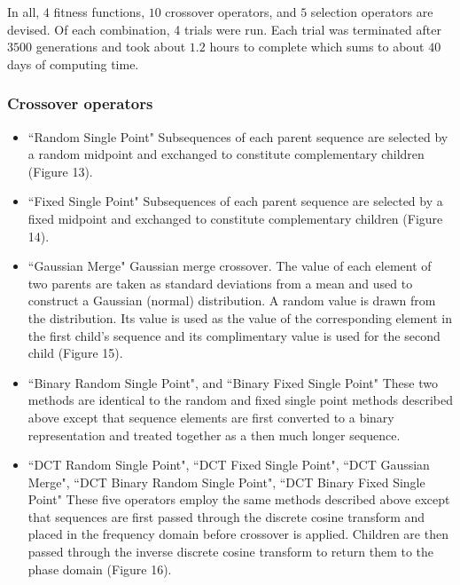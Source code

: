 \documentclass[12pt]{article}
\begin{document}
In all, $4$ fitness functions, $10$ crossover operators, and $5$ selection
operators
are devised.  Of each combination, 4 trials were run.  Each trial was
terminated after $3500$ generations and took about $1.2$ hours to complete
which sums to about $40$ days of computing time.

\subsubsection{Crossover operators}
\begin{itemize}
\item ``Random Single Point"  Subsequences of each parent sequence are selected by a random midpoint and exchanged to constitute complementary children (Figure 13).
\item ``Fixed Single Point"  Subsequences of each parent sequence are selected by a fixed midpoint and exchanged to constitute complementary children (Figure 14).
\item ``Gaussian Merge"  Gaussian merge crossover.  The value of each element of two parents are taken as standard deviations from a mean and used to construct a Gaussian (normal) distribution.  A random value is drawn from the
distribution.  Its value is used as the value of the corresponding element
in the first child's sequence and its complimentary value is used for the
second child (Figure 15).
\item ``Binary Random Single Point", and ``Binary Fixed Single Point"  These two methods are identical to the random and fixed single point
methods described above except that sequence elements are first converted
to a binary representation and treated together as a then much longer sequence.
\item ``DCT Random Single Point", ``DCT Fixed Single Point", ``DCT Gaussian Merge", ``DCT Binary Random Single Point", ``DCT Binary Fixed Single Point"  These five operators employ the same methods described above except that sequences are first passed through the discrete cosine transform and placed in the frequency domain before crossover is applied.  Children are then passed through the inverse discrete cosine transform to return them to the phase domain (Figure 16).
\end{itemize}
\end{document}
